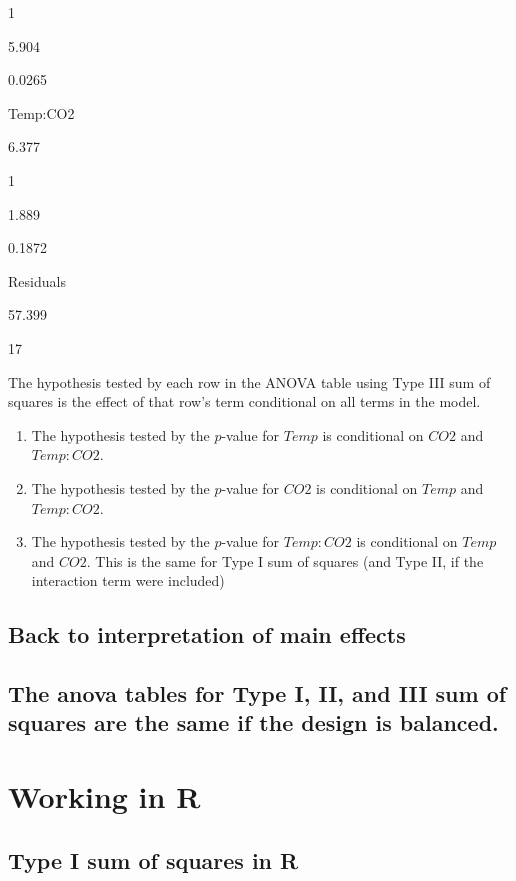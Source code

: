 \documentclass[]{book}
\begin{document}
1

5.904

0.0265

Temp:CO2

6.377

1

1.889

0.1872

Residuals

57.399

17

The hypothesis tested by each row in the ANOVA table using Type III sum
of squares is the effect of that row's term conditional on all terms in
the model.

\begin{enumerate}
\def\labelenumi{\arabic{enumi}.}
\item
  The hypothesis tested by the \(p\)-value for \(Temp\) is conditional
  on \(CO2\) and \(Temp:CO2\).
\item
  The hypothesis tested by the \(p\)-value for \(CO2\) is conditional on
  \(Temp\) and \(Temp:CO2\).
\item
  The hypothesis tested by the \(p\)-value for \(Temp:CO2\) is
  conditional on \(Temp\) and \(CO2\). This is the same for Type I sum
  of squares (and Type II, if the interaction term were included)
\end{enumerate}

\subsection{Back to interpretation of main
effects}\label{back-to-interpretation-of-main-effects}

\subsection{The anova tables for Type I, II, and III sum of squares are
the same if the design is
balanced.}\label{the-anova-tables-for-type-i-ii-and-iii-sum-of-squares-are-the-same-if-the-design-is-balanced.}

\section{Working in R}\label{working-in-r-5}

\subsection{Type I sum of squares in
R}\label{type-i-sum-of-squares-in-r}
\end{document}
